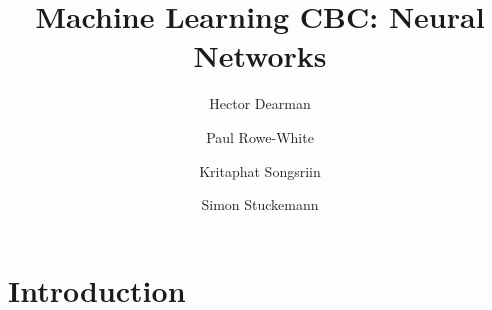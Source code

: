 \documentclass[10pt,a4paper]{article}
\author{Hector Dearman \and Paul Rowe-White \and Kritaphat Songsriin \and Simon Stuckemann}
\title{Machine Learning CBC: Neural Networks}
\begin{document}
\maketitle

\section{Introduction}
\end{document}

